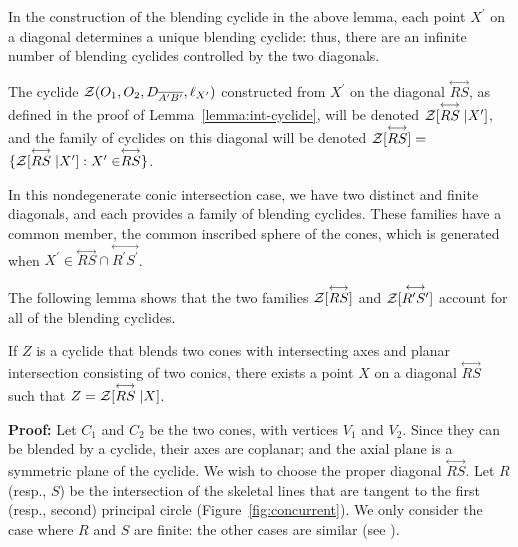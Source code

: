 In the construction of the blending cyclide in the above lemma, each point
$X^\prime$ on a diagonal determines a unique blending cyclide: thus, there
are an infinite number of blending cyclides controlled by the two diagonals.

\begin{definition}
\label{defn:family}
The cyclide 
${\cal Z}(O_1,O_2,D_{\overline{A^\prime B^\prime}},\ell_{X^\prime})$
constructed from 
$X^\prime$ on the diagonal $\stackrel{\longleftrightarrow}{RS}$, 
as defined in the proof of Lemma~\ref{lemma:int-cyclide},
will be denoted \mbox{${\cal Z}[\stackrel{\longleftrightarrow}{RS}|X^\prime]$},
and the family of cyclides on this diagonal will be denoted 
\mbox{${\cal Z}[\stackrel{\longleftrightarrow}{RS}] =$} \\
\mbox{$\{ {\cal Z}[\stackrel{\longleftrightarrow}{RS}|X^\prime]: X^\prime \in 
\stackrel{\longleftrightarrow}{RS}\}$}.
\end{definition}

\begin{remark}
In this nondegenerate conic intersection case, we have two distinct
and finite diagonals, and each provides a family of blending cyclides.
These families have a common member, the common inscribed sphere of the cones,
which is generated when $X^\prime\in\stackrel{\longleftrightarrow}{RS}\cap
\stackrel{\longleftrightarrow}{R^\prime S^\prime}$.
\end{remark}

The following lemma shows that the two families 
${\cal Z}[\stackrel{\longleftrightarrow}{RS}]$ and 
${\cal Z}[\stackrel{\longleftrightarrow}{R^\prime S^\prime}]$
account for all of the blending cyclides.

\begin{lemma}
\label{lemma:two-families}
If $Z$ is a cyclide that blends two cones with intersecting
axes and planar intersection consisting of two conics, 
there exists a point $X$ on a diagonal $\stackrel{\longleftrightarrow}{RS}$
such that $Z = {\cal Z}[\stackrel{\longleftrightarrow}{RS}|X]$.
\end{lemma}
{\bf Proof:} 
Let $C_1$ and $C_2$ be the two cones, with vertices $V_1$ and $V_2$.
Since they can be blended by a cyclide, their axes are coplanar;
and the axial plane is a symmetric plane of the cyclide.
We wish to choose the proper diagonal 
$\stackrel{\longleftrightarrow}{RS}$.
Let $R$ (resp., $S$) be the intersection of the skeletal lines that are
tangent to the first (resp., second) principal circle 
(Figure~\ref{fig:concurrent}).
We only consider the case where $R$ and $S$ are finite: the other cases
are similar (see \cite[Lemma~5.14]{shenethesis}).


